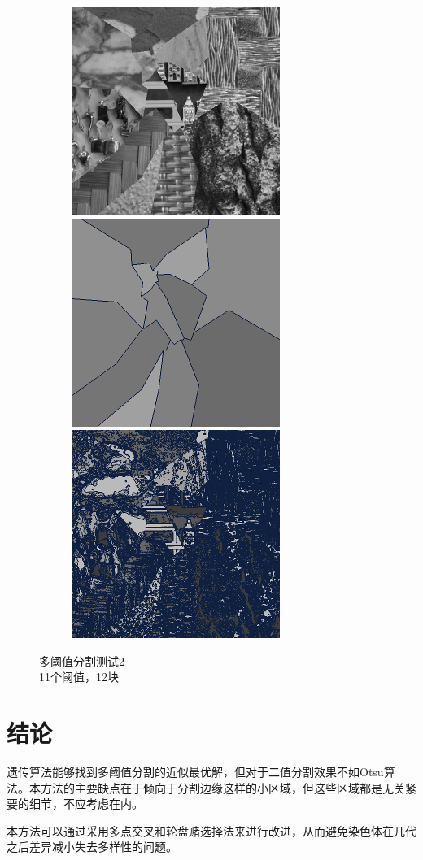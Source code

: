 \documentclass[11pt,a4paper,titlepage]{article}
\begin{document}
\begin{figure}[!htb]
  \begin{subfigure}{\linewidth}
  \includegraphics[width=.3\linewidth]{mosaic21.png}\hfill
  \includegraphics[width=.3\linewidth]{mosaic22.png}\hfill
  \includegraphics[width=.3\linewidth]{mosaic23.png}
  \end{subfigure}\par\medskip
  \caption{多阈值分割测试2\\
  11个阈值，12块}
\end{figure}

\section{结论}
遗传算法能够找到多阈值分割的近似最优解，但对于二值分割效果不如Otsu算法。本方法的主要缺点在于倾向于分割边缘这样的小区域，但这些区域都是无关紧要的细节，不应考虑在内。

本方法可以通过采用多点交叉和轮盘赌选择法来进行改进，从而避免染色体在几代之后差异减小失去多样性的问题。

\setmainfont{Times-Roman}



\end{document}
